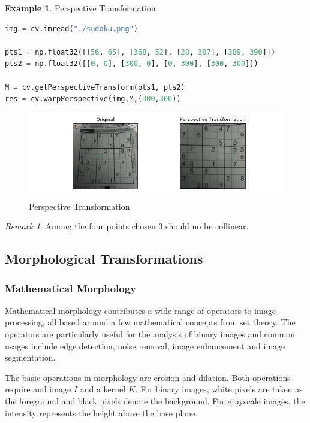 \documentclass{article}
\theoremstyle{definition}
\newtheorem{ex}{Example}[subsection]
\theoremstyle{remark}
\newtheorem*{rem}{Remark}
\begin{document}
\begin{ex} Perspective Transformation
\begin{lstlisting}[language=Python]
img = cv.imread("./sudoku.png")

pts1 = np.float32([[56, 65], [368, 52], [28, 387], [389, 390]])
pts2 = np.float32([[0, 0], [300, 0], [0, 300], [300, 300]])

M = cv.getPerspectiveTransform(pts1, pts2)
res = cv.warpPerspective(img,M,(300,300))
\end{lstlisting}
\begin{figure}[h!]
    \centering
    \includegraphics[width=\textwidth]{ocv_gt_pertran}
    \caption{Perspective Transformation}
    \label{fig:ocv_per_tran}
\end{figure}
\end{ex}

\begin{rem}
Among the four points chosen 3 should no be collinear.
\end{rem}


\break


\subsection{Morphological Transformations}

\subsubsection{Mathematical Morphology}

Mathematical morphology contributes a wide range of operators to image processing, all based around a few mathematical concepts from set theory. The operators are particularly useful for the analysis of binary images and common usages include edge detection, noise removal, image enhancement and image segmentation. 


The basic operations in morphology are erosion and dilation. Both operations require and image $ I $ and a kernel $ K $. For binary images, white pixels are taken as the foreground and black pixels denote the background. For grayscale images, the intensity represents the height above the base plane. 
\end{document}
